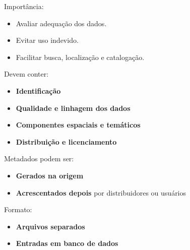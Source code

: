 Importância:
\begin{itemize}
\item Avaliar adequação dos dados.
\item Evitar uso indevido.
\item Facilitar busca, localização e catalogação.
\end{itemize}

Devem conter:
\begin{itemize}
\item \textbf{Identificação}
\item \textbf{Qualidade e linhagem dos dados}
\item \textbf{Componentes espaciais e temáticos}
\item \textbf{Distribuição e licenciamento}
\end{itemize}

Metadados podem ser:
\begin{itemize}
\item \textbf{Gerados na origem}
\item \textbf{Acrescentados depois} por distribuidores ou usuários
\end{itemize}

Formato:
\begin{itemize}
\item \textbf{Arquivos separados}
\item \textbf{Entradas em banco de dados}
\end{itemize}

\pagestyle{empty}
